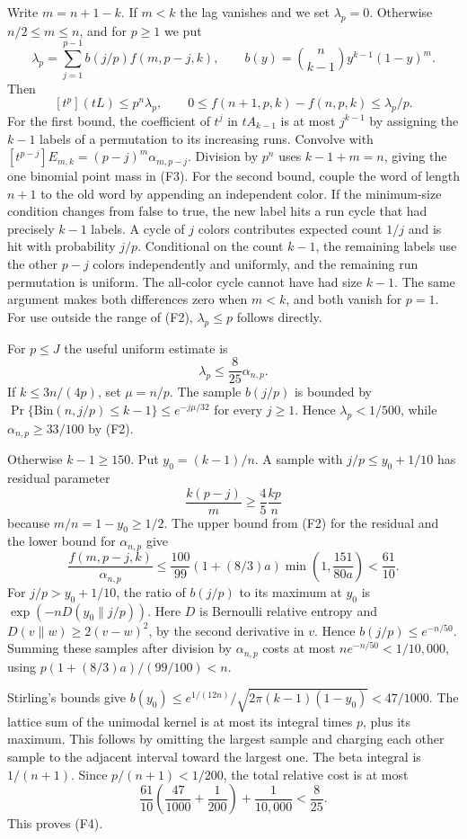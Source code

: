 Write $m=n+1-k$. If $m<k$ the lag vanishes and we set $\lambda_p=0$. Otherwise $n/2\le m\le n$, and for $p\ge1$ we put
\[
\lambda_p=\sum_{j=1}^{p-1} b(j/p)f(m,p-j,k),
\qquad
b(y)=\binom n{k-1}y^{k-1}(1-y)^m.
\]
Then
\[
[t^p](tL)\le p^n\lambda_p,\qquad
0\le f(n+1,p,k)-f(n,p,k)\le \lambda_p/p .
\tag{F3}
\]
For the first bound, the coefficient of $t^j$ in $tA_{k-1}$ is at most $j^{k-1}$ by assigning the $k-1$ labels of a permutation to its increasing runs. Convolve with $[t^{p-j}]E_{m,k}=(p-j)^m\alpha_{m,p-j}$. Division by $p^n$ uses $k-1+m=n$, giving the one binomial point mass in (F3). For the second bound, couple the word of length $n+1$ to the old word by appending an independent color. If the minimum-size condition changes from false to true, the new label hits a run cycle that had precisely $k-1$ labels. A cycle of $j$ colors contributes expected count $1/j$ and is hit with probability $j/p$. Conditional on the count $k-1$, the remaining labels use the other $p-j$ colors independently and uniformly, and the remaining run permutation is uniform. The all-color cycle cannot have had size $k-1$. The same argument makes both differences zero when $m<k$, and both vanish for $p=1$. For use outside the range of (F2), $\lambda_p\le p$ follows directly.

For $p\le J$ the useful uniform estimate is
\[
\lambda_p\le \frac8{25}\alpha_{n,p}.
\tag{F4}
\]
If $k\le3n/(4p)$, set $\mu=n/p$. The sample $b(j/p)$ is bounded by $\Pr\{\mathrm{Bin}(n,j/p)\le k-1\}\le e^{-j\mu/32}$ for every $j\ge1$. Hence $\lambda_p<1/500$, while $\alpha_{n,p}\ge33/100$ by (F2).

Otherwise $k-1\ge150$. Put $y_0=(k-1)/n$. A sample with $j/p\le y_0+1/10$ has residual parameter
\[
\frac{k(p-j)}m\ge\frac45\frac{kp}n
\]
because $m/n=1-y_0\ge1/2$. The upper bound from (F2) for the residual and the lower bound for $\alpha_{n,p}$ give
\[
\frac{f(m,p-j,k)}{\alpha_{n,p}}
\le \frac{100}{99}(1+(8/3)a)\min\left(1,\frac{151}{80a}\right)
<\frac{61}{10}.
\]
For $j/p>y_0+1/10$, the ratio of $b(j/p)$ to its maximum at $y_0$ is $\exp(-nD(y_0\|j/p))$. Here $D$ is Bernoulli relative entropy and $D(v\|w)\ge2(v-w)^2$, by the second derivative in $v$. Hence $b(j/p)\le e^{-n/50}$. Summing these samples after division by $\alpha_{n,p}$ costs at most $n e^{-n/50}<1/10{,}000$, using $p(1+(8/3)a)/(99/100)<n$.

Stirling's bounds give $b(y_0)\le e^{1/(12n)}/\sqrt{2\pi(k-1)(1-y_0)}<47/1000$. The lattice sum of the unimodal kernel is at most its integral times $p$, plus its maximum. This follows by omitting the largest sample and charging each other sample to the adjacent interval toward the largest one. The beta integral is $1/(n+1)$. Since $p/(n+1)<1/200$, the total relative cost is at most
\[
\frac{61}{10}\left(\frac{47}{1000}+\frac1{200}\right)+\frac1{10{,}000}
<\frac8{25}.
\]
This proves (F4).

